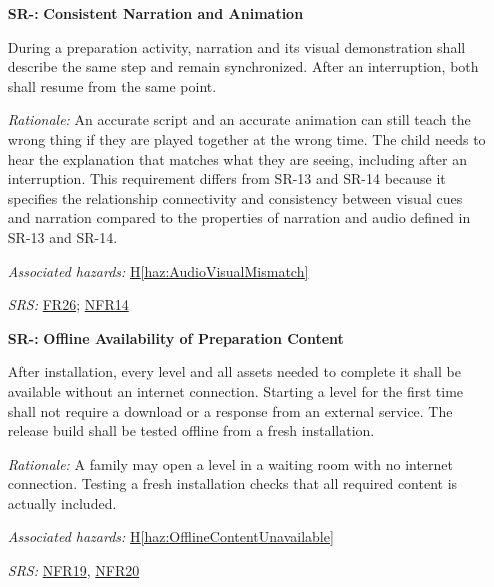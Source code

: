 \documentclass{article}
\newcounter{hazard}
\newcommand{\hazref}[1]{\hyperref[haz:#1]{H\ref*{haz:#1}}}
\newcounter{sr}
\newcommand{\srdef}[1]{\refstepcounter{sr}\label{sr:#1}\textbf{SR-\thesr:}}
\newcommand{\srsurl}{https://team-hindsight.github.io/ophthamology-game/SRS/SRS.pdf}
\newcommand{\srsfrref}[2]{\href{\srsurl\#nameddest=#1}{FR#2}}
\newcommand{\srsnfrref}[2]{\href{\srsurl\#nameddest=#1}{NFR#2}}
\begin{document}
\begin{itemize}[leftmargin=1.5cm, labelwidth=1.3cm, labelsep=0.2cm,
  align=left, itemsep=1.2em, parsep=0.6em]
\textit{Rationale:}
A child can be unable to use a game that runs correctly.
Small controls or instructions they cannot follow can stop
preparation and leave the child frustrated or anxious.
Instructions and interactions need to be tested with the
intended ages and abilities, not just checked for game errors.

\textit{Associated hazards:}
\hazref{InaccessibleInteraction}

\textit{SRS:} \srsfrref{FR_SpokenInstructions}{12}, \srsfrref{FR_Preferences}{43}; \srsnfrref{NFR_TouchTarget}{3}, \srsnfrref{NFR_Usability}{5}, \srsnfrref{NFR_Language}{8}, \srsnfrref{NFR_Accessibility}{9}, \srsnfrref{NFR_Colour}{10}

\item[\srdef{ConsistentAudioVisuals}]
\textbf{Consistent Narration and Animation}

During a preparation activity, narration and its visual
demonstration shall describe the same step and
remain synchronized. After an interruption, both shall
resume from the same point.

\textit{Rationale:}
An accurate script and an accurate animation can still
teach the wrong thing if they are played together at the
wrong time. The child needs to hear the explanation that
matches what they are seeing, including after an interruption. 
This requirement differs from SR-13 and SR-14 because it specifies 
the relationship connectivity and consistency between visual cues 
and narration compared to the properties of narration and audio 
defined in SR-13 and SR-14.

\textit{Associated hazards:}
\hazref{AudioVisualMismatch}

\textit{SRS:} \srsfrref{FR_Suspend}{26}; \srsnfrref{NFR_AVSync}{14}

\item[\srdef{OfflinePreparation}]
\textbf{Offline Availability of Preparation Content}

After installation, every level and all assets
needed to complete it shall be available without an internet
connection. Starting a level for the first time shall not
require a download or a response from an external service.
The release build shall be tested offline from a fresh
installation.

\textit{Rationale:}
A family may open a level in a waiting room with no
internet connection. Testing a fresh installation checks that all
required content is actually included.

\textit{Associated hazards:}
\hazref{OfflineContentUnavailable}

\textit{SRS:} \srsnfrref{NFR_Offline}{19}, \srsnfrref{NFR_Installability}{20}

\end{itemize}
\end{document}
